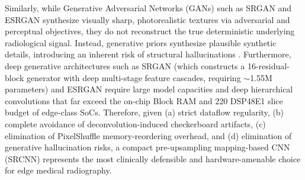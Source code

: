 \documentclass[conference]{IEEEtran}
\begin{document}
\begin{table}[t]
\centering
\caption{Comparison of FPGA-Based Super-Resolution Accelerators}
\label{tab:fpga_comparison}
\renewcommand{\arraystretch}{1.3}
\setlength{\tabcolsep}{5pt}
\end{table}

Similarly, while Generative Adversarial Networks (GANs) such as SRGAN \cite{ledig2017photo} and ESRGAN \cite{wang2018esrgan} synthesize visually sharp, photorealistic textures via adversarial and perceptual objectives, they do not reconstruct the true deterministic underlying radiological signal. Instead, generative priors synthesize plausible synthetic details, introducing an inherent risk of structural hallucinations \cite{bhadra2021hallucinations, giraldo2024perceptual}. Furthermore, deep generative architectures such as SRGAN \cite{ledig2017photo} (which constructs a 16-residual-block generator with deep multi-stage feature cascades, requiring $\sim$1.55M parameters) and ESRGAN \cite{wang2018esrgan} require large model capacities and deep hierarchical convolutions that far exceed the on-chip Block RAM and 220 DSP48E1 slice budget of edge-class SoCs. Therefore, given (a) strict dataflow regularity, (b) complete avoidance of deconvolution-induced checkerboard artifacts, (c) elimination of PixelShuffle memory-reordering overhead, and (d) elimination of generative hallucination risks, a compact pre-upsampling mapping-based CNN (SRCNN) represents the most clinically defensible and hardware-amenable choice for edge medical radiography.
\end{document}
